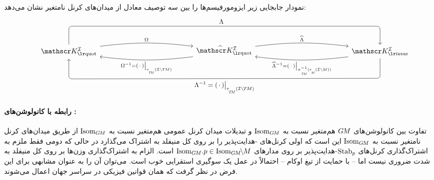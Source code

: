 نمودار جابجایی زیر ایزومورفیسم‌ها را بین سه توصیف معادل از میدان‌های کرنل نامتغیر نشان می‌دهد:
\begin{equation}
    \begin{tikzcd}[row sep=3.5em, column sep=13.em]
        \KIquot
            \arrow[r, bend left=7, shift left=2pt, "\Omega"]
            \arrow[rr, rounded corners, to path={ 
                    -- ([yshift=6.ex]\tikztostart.north) 
                    --node[above, pos=.49]{\small$\Lambda$} ([yshift=6.ex]\tikztotarget.north) 
                    -- (\tikztotarget.north)
                    }]
        &
        \KIquothat
            \arrow[r, bend left=7, shift left=2pt, "\widehat{\Lambda}"]
            \arrow[l, bend left=7, shift left=2pt, "\Omega^{-1} = (\,\cdot\,)\big|_{\rTM(\ITM)}"]
        &
        \KIfull
            \arrow[l, bend left=7, shift left=2pt, "\widehat{\Lambda}^{-1} = (\,\cdot\,)\big|_{\piTM^{-1}(\rM(\IM))}"]
            \arrow[ll, rounded corners, to path={ 
                    -- ([yshift=-6.5ex]\tikztostart.south) 
                    --node[below, pos=.5]{\small$\Lambda^{-1} = (\,\cdot\,)\big|_{\rTM(\ITM)}$} ([yshift=-6.5ex]\tikztotarget.south) 
                    -- (\tikztotarget.south)
                    }]
    \end{tikzcd}
\end{equation}










\paragraph{رابطه با کانولوشن‌های :}

تفاوت بین کانولوشن‌های $G\mkern-1.4muM$ هم‌متغیر نسبت به $\operatorname{Isom}_{G\mkern-1.4muM}$ و تبدیلات میدان کرنل عمومی هم‌متغیر نسبت به $\operatorname{Isom}_{G\mkern-1.4muM}$ از طریق میدان‌های کرنل نامتغیر نسبت به $\operatorname{Isom}_{G\mkern-1.4muM}$ این است که اولی کرنل‌های -هدایت‌پذیر را بر روی کل منیفلد به اشتراک می‌گذارد در حالی که دومی فقط ملزم به اشتراک‌گذاری کرنل‌های $\operatorname{Stab}_{p}$-هدایت‌پذیر بر روی مدارهای $\IsomGM\!.p \in \IsomGMM$ است.
الزام به اشتراک‌گذاری وزن‌ها بر روی کل منیفلد به شدت ضروری نیست اما -- با حمایت از تیغ اوکام -- احتمالاً در عمل یک سوگیری استقرایی خوب است.
می‌توان آن را به عنوان مشابهی برای این فرض در نظر گرفت که همان قوانین فیزیکی در سراسر جهان اعمال می‌شوند.

